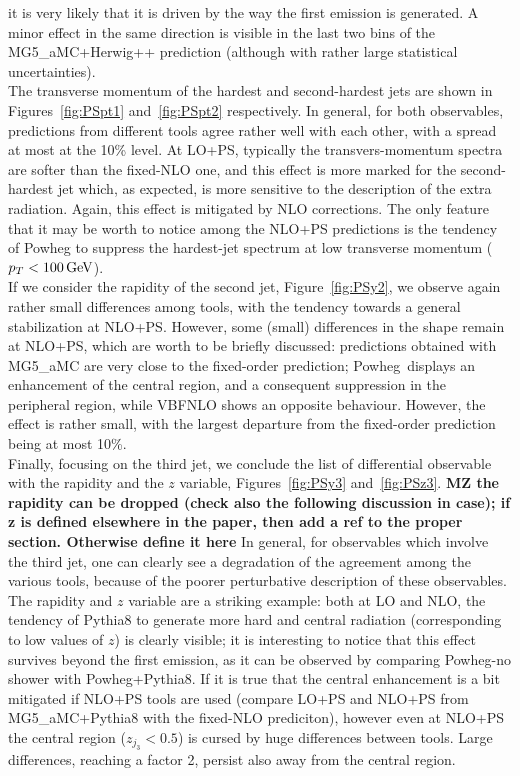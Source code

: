 it is very likely that it is driven by the way the first emission is generated. A minor effect in the same direction is visible in the last two bins of the 
{\sc MG5\_aMC+Herwig++} prediction (although with rather large statistical uncertainties).\\
The transverse momentum of the hardest and second-hardest jets are shown in Figures~\ref{fig:PSpt1} and~\ref{fig:PSpt2} respectively. In general, for both observables, 
predictions from different tools agree rather well with each other, with a spread at most at the 10\% level. At LO+PS, typically the transvers-momentum spectra are softer than
the fixed-NLO one, and this effect is more marked for the second-hardest jet which, as expected, is more sensitive to the description of the extra radiation. Again, this
effect is mitigated by NLO corrections. The only feature that it may be worth to notice among the NLO+PS predictions is the tendency of {\sc Powheg} to suppress the
hardest-jet spectrum at low transverse momentum ($p_T<100 \,\text{GeV}$).\\
If we consider the rapidity of the second jet, Figure~\ref{fig:PSy2}, we observe again rather small differences among tools, with the tendency towards a general 
stabilization at NLO+PS. However, some (small) differences in the shape remain at NLO+PS, which are worth to be briefly discussed: predictions 
obtained with {\sc MG5\_aMC} are very close to the fixed-order prediction; {\sc Powheg}\ displays an enhancement of the central region, and a consequent suppression in the
peripheral region, while {\sc VBFNLO} shows an opposite behaviour. However, the effect is rather small, with the largest departure from the fixed-order prediction being 
at most 10\%.\\
Finally, focusing on the third jet, we conclude the list of differential observable with the rapidity and the $z$ variable, Figures~\ref{fig:PSy3} and~\ref{fig:PSz3}. 
{\bf MZ the rapidity can be dropped (check also the following discussion in case); if z is defined elsewhere in the paper, then add a ref to the proper section. Otherwise define it here} 
In general, for observables which involve the third jet, one 
can clearly see a degradation of the agreement among the various tools, because of the poorer perturbative description of these observables. The rapidity and $z$ variable
are a striking example: both at LO and NLO, the tendency of {\sc Pythia8} to generate more hard and central radiation (corresponding to low values of $z$) 
is clearly visible; it is interesting to notice that
this effect survives beyond the first emission, as it can be observed by comparing {\sc Powheg-no shower} with {\sc Powheg+Pythia8}. If it is true that the central enhancement
is a bit mitigated if NLO+PS tools are used (compare LO+PS and NLO+PS from {\sc MG5\_aMC+Pythia8} with the fixed-NLO prediciton), however even at NLO+PS the central region 
($z_{j_3}<0.5$) is cursed by huge differences between tools. Large differences, reaching a factor 2, persist also away from the central region. \\

